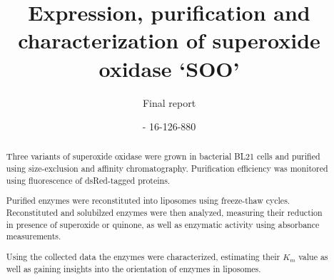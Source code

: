 \documentclass[a4paper,overfullrule=true,9pt]{scrartcl}
\title{Expression, purification and characterization of superoxide oxidase `SOO'}
\subtitle{Final report}
\author{\maillink{michael.senn@students.unibe.ch}{Michael Senn} - 16-126-880}
\date{\printdate}
\begin{document}
\maketitle

\begin{abstract}
	Three variants of superoxide oxidase were grown in bacterial BL21 cells
	and purified using size-exclusion and affinity chromatography.
	Purification efficiency was monitored using fluorescence of
	dsRed-tagged proteins.

	Purified enzymes were reconstituted into liposomes using freeze-thaw
	cycles. Reconstituted and solubilzed enzymes were then analyzed,
	measuring their reduction in presence of superoxide or quinone, as well
	as enzymatic activity using absorbance measurements.

	Using the collected data the enzymes were characterized, estimating
	their $K_m$ value as well as gaining insights into the orientation of
	enzymes in liposomes.
\end{abstract}









\newpage


\end{document}
